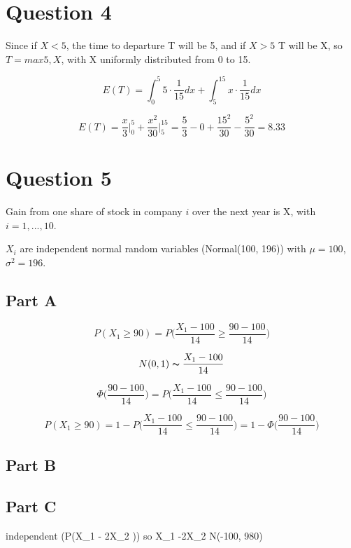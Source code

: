 \documentclass[letterpaper]{article}
\begin{document}
\newpage

\section*{Question 4}

Since if $X < 5$, the time to departure  T will be 5, and if $X > 5$ T will be X, so $T = max{5, X}$, with X uniformly distributed from 0 to 15.

$$E(T) = \int_0^5 5 \cdot \frac{1}{15} dx + \int_5^{15} x \cdot \frac{1}{15} dx$$

$$E(T) = \frac{x}{3} \Big|_0^5 + \frac{x^2}{30} \Big|_5^{15} = \frac{5}{3} - 0 + \frac{15^2}{30} - \frac{5^2}{30} = 8.33$$

\newpage

\section*{Question 5}

Gain from one share of stock in company $i$ over the next year is X, with $i = 1,...,10$.

\noindent $X_i$ are independent normal random variables (Normal(100, 196)) with $\mu = 100$, $\sigma^2 = 196$.

\subsection*{Part A}

$$P(X_1 \geq 90) = P \Big( \frac{X_1 - 100}{14} \geq \frac{90 - 100}{14} \Big)$$

$$N(0, 1) \thicksim \frac{X_1 - 100}{14}$$

$$\Phi \Big( \frac{90 - 100}{14} \Big) = P \Big( \frac{X_1 - 100}{14} \leq \frac{90 - 100}{14} \Big)$$

$$P(X_1 \geq 90) = 1 - P \Big( \frac{X_1 - 100}{14} \leq \frac{90 - 100}{14} \Big) = 1 - \Phi \Big( \frac{90 - 100}{14} \Big)$$

\subsection*{Part B}



\subsection*{Part C}

independent (P(X_1 - 2X_2 )) so X_1 -2X_2 \thicksim N(-100, 980)
\end{document}
